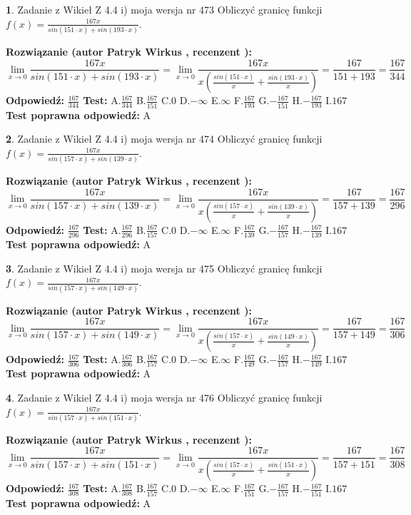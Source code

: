\documentclass[12pt, a4paper]{article}
\theoremstyle{definition} %
\newtheorem{zad}{}
\newcommand{\zadStart}[1]{\begin{zad}#1\newline}
\newcommand{\zadStop}{\end{zad}}
\newcommand{\rozwStart}[2]{\noindent \textbf{Rozwiązanie (autor #1 , recenzent #2): }\newline}
\newcommand{\rozwStop}{\newline}
\newcommand{\odpStart}{\noindent \textbf{Odpowiedź:}\newline}
\newcommand{\odpStop}{\newline}
\newcommand{\testStart}{\noindent \textbf{Test:}\newline}
\newcommand{\testStop}{\newline}
\newcommand{\kluczStart}{\noindent \textbf{Test poprawna odpowiedź:}\newline}
\newcommand{\kluczStop}{\newline}
\begin{document}
\zadStart{Zadanie z Wikieł Z 4.4 i) moja wersja nr 473}
Obliczyć granicę funkcji $f(x)=\frac{167x}{sin(151\cdot x) +sin(193\cdot x)}$.
\zadStop
\rozwStart{Patryk Wirkus}{}
$$\lim\limits_{x\to 0}\frac{167x}{sin(151\cdot x) +sin(193\cdot x)}=\lim\limits_{x\to 0}\frac{167x}{x(\frac{sin(151\cdot x)}{x}+\frac{sin(193\cdot x)}{x})}=\frac{167}{151+193} = \frac{167}{344}$$
\rozwStop
\odpStart
$\frac{167}{344}$
\odpStop
\testStart
A.$\frac{167}{344}$
B.$\frac{167}{151}$
C.$0$
D.$-\infty$
E.$\infty$
F.$\frac{167}{193}$
G.$-\frac{167}{151}$
H.$-\frac{167}{193}$
I.$167$
\testStop
\kluczStart
A
\kluczStop



\zadStart{Zadanie z Wikieł Z 4.4 i) moja wersja nr 474}
Obliczyć granicę funkcji $f(x)=\frac{167x}{sin(157\cdot x) +sin(139\cdot x)}$.
\zadStop
\rozwStart{Patryk Wirkus}{}
$$\lim\limits_{x\to 0}\frac{167x}{sin(157\cdot x) +sin(139\cdot x)}=\lim\limits_{x\to 0}\frac{167x}{x(\frac{sin(157\cdot x)}{x}+\frac{sin(139\cdot x)}{x})}=\frac{167}{157+139} = \frac{167}{296}$$
\rozwStop
\odpStart
$\frac{167}{296}$
\odpStop
\testStart
A.$\frac{167}{296}$
B.$\frac{167}{157}$
C.$0$
D.$-\infty$
E.$\infty$
F.$\frac{167}{139}$
G.$-\frac{167}{157}$
H.$-\frac{167}{139}$
I.$167$
\testStop
\kluczStart
A
\kluczStop



\zadStart{Zadanie z Wikieł Z 4.4 i) moja wersja nr 475}
Obliczyć granicę funkcji $f(x)=\frac{167x}{sin(157\cdot x) +sin(149\cdot x)}$.
\zadStop
\rozwStart{Patryk Wirkus}{}
$$\lim\limits_{x\to 0}\frac{167x}{sin(157\cdot x) +sin(149\cdot x)}=\lim\limits_{x\to 0}\frac{167x}{x(\frac{sin(157\cdot x)}{x}+\frac{sin(149\cdot x)}{x})}=\frac{167}{157+149} = \frac{167}{306}$$
\rozwStop
\odpStart
$\frac{167}{306}$
\odpStop
\testStart
A.$\frac{167}{306}$
B.$\frac{167}{157}$
C.$0$
D.$-\infty$
E.$\infty$
F.$\frac{167}{149}$
G.$-\frac{167}{157}$
H.$-\frac{167}{149}$
I.$167$
\testStop
\kluczStart
A
\kluczStop



\zadStart{Zadanie z Wikieł Z 4.4 i) moja wersja nr 476}
Obliczyć granicę funkcji $f(x)=\frac{167x}{sin(157\cdot x) +sin(151\cdot x)}$.
\zadStop
\rozwStart{Patryk Wirkus}{}
$$\lim\limits_{x\to 0}\frac{167x}{sin(157\cdot x) +sin(151\cdot x)}=\lim\limits_{x\to 0}\frac{167x}{x(\frac{sin(157\cdot x)}{x}+\frac{sin(151\cdot x)}{x})}=\frac{167}{157+151} = \frac{167}{308}$$
\rozwStop
\odpStart
$\frac{167}{308}$
\odpStop
\testStart
A.$\frac{167}{308}$
B.$\frac{167}{157}$
C.$0$
D.$-\infty$
E.$\infty$
F.$\frac{167}{151}$
G.$-\frac{167}{157}$
H.$-\frac{167}{151}$
I.$167$
\testStop
\kluczStart
A
\kluczStop
\end{document}
